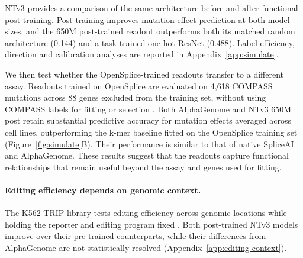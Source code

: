 NTv3 provides a comparison of the same architecture before and after
functional post-training. Post-training improves mutation-effect
prediction at both model sizes, and the 650M post-trained readout
outperforms both its matched random architecture (0.144) and a
task-trained one-hot ResNet (0.488). Label-efficiency, direction and calibration analyses are
reported in Appendix~\ref{app:simulate}.

We then test whether the OpenSplice-trained readouts transfer to a different assay. Readouts trained on OpenSplice are evaluated on 4,618 COMPASS mutations across 88 genes excluded from the training set, without using COMPASS labels for fitting or selection \citep{koplik2025compass}.
Both AlphaGenome and NTv3 650M post retain substantial predictive accuracy for mutation effects averaged across cell lines, outperforming the k-mer baseline fitted on the OpenSplice training set
(Figure~\ref{fig:simulate}B). Their performance is similar to that of native SpliceAI and AlphaGenome. These results suggest that the readouts capture functional relationships that remain useful beyond the assay and genes used for fitting.


\paragraph{Editing efficiency depends on genomic context.}

The K562 TRIP library tests editing efficiency across genomic
locations while holding the reporter and editing program fixed
\citep{mathis2025pridict2}. Both post-trained NTv3 models improve over
their pre-trained counterparts, while their differences from AlphaGenome
are not statistically resolved (Appendix~\ref{app:editing-context}).


